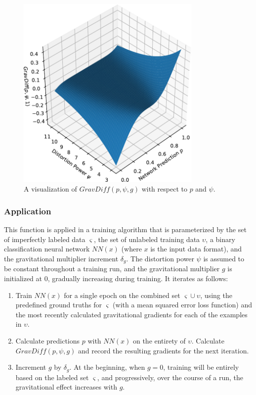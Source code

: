 \documentclass[10pt]{article}
\begin{document}
\begin{figure}[h]
    \centering
    \includegraphics[width=0.8\textwidth]{grav_diff}
    \caption{\label{grav_diff} A visualization of $GravDiff(p, \psi, g)$ with respect to $p$ and $\psi$.}
\end{figure}

\subsubsection{Application}

This function is applied in a training algorithm that is parameterized by the set of imperfectly labeled data $\varsigma$, the set of unlabeled training data $\upsilon$, a binary classification neural network $NN(x)$ (where $x$ is the input data format), and the gravitational multiplier increment $\delta_g$. The distortion power $\psi$ is assumed to be constant throughout a training run, and the gravitational multiplier $g$ is initialized at 0, gradually increasing during training. It iterates as follows:

\begin{enumerate}
    \item Train $NN(x)$ for a single epoch on the combined set $\varsigma \cup \upsilon$, using the predefined ground truths for $\varsigma$ (with a mean squared error loss function) and the most recently calculated gravitational gradients for each of the examples in $\upsilon$.
    \item Calculate predictions $p$ with $NN(x)$ on the entirety of $\upsilon$. Calculate $GravDiff(p, \psi, g)$ and record the resulting gradients for the next iteration.
    \item Increment $g$ by $\delta_{g}$. At the beginning, when $g = 0$, training will be entirely based on the labeled set $\varsigma$, and progressively, over the course of a run, the gravitational effect increases with $g$.
\end{enumerate}
\end{document}

